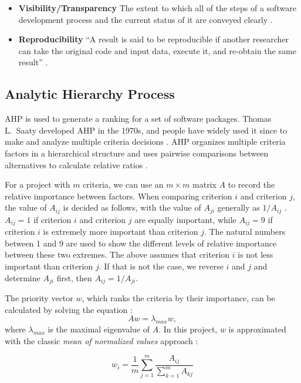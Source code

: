 \documentclass[final, 3p, times, authoryear]{elsarticle}
\begin{document}
\begin{itemize}
	\item \textbf{Visibility/Transparency} The extent to which all of the steps
	of a software development process and the current status of it are conveyed
	clearly \citep{ghezzi1991fundamentals}.

	\item \textbf{Reproducibility} ``A result is said to be reproducible if
	another researcher can take the original code and input data, execute it,
	and re-obtain the same result'' \citep{BenureauAndRougier2017}.
\end{itemize}

\subsection{Analytic Hierarchy Process} \label{sec_AHP}

AHP is used to generate a ranking for a set of software packages. Thomas L.\
Saaty developed AHP in the 1970s, and people have widely used it since to make
and analyze multiple criteria decisions \citep{VaidyaEtAl2006}. AHP organizes
multiple criteria factors in a hierarchical structure and uses pairwise
comparisons between alternatives to calculate relative ratios \citep{Saaty1990}.

For a project with $m$ criteria, we can use an $m\times m$ matrix $A$ to record
the relative importance between factors. When comparing criterion $i$ and
criterion $j$, the value of $A_{ij}$ is decided as follows, with the value of
$A_{ji}$ generally as $1/A_{ij}$ \citep{Saaty1990}.  $A_{ij} = 1$ if criterion
$i$ and criterion $j$ are equally important, while $A_{ij} = 9$ if criterion $i$
is extremely more important than criterion $j$.  The natural numbers between 1
and 9 are used to show the different levels of relative importance between these
two extremes. The above assumes that criterion $i$ is not less important than
criterion $j$.  If that is not the case, we reverse $i$ and $j$ and determine
$A_{ji}$ first, then $A_{ij} = 1/A_{ji}$.

The priority vector $w$, which ranks the criteria by their importance, can be
calculated by solving the equation \citep{Saaty1990}:
\begin{equation} 
    A w = \lambda_{max} w,
\end{equation}
where $\lambda_{max}$ is the maximal eigenvalue of $A$.  In this project, $w$ is
approximated with the classic \textit{mean of normalized values} approach
\citep{AlessioEtAl2006}:

\begin{equation}
w_i = \frac{1}{m}\sum_{j=1}^{m}\frac{A_{ij}}{\sum_{k=1}^{m}A_{kj}}
\end{equation}
\end{document}
